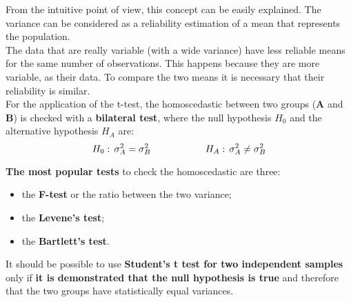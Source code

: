 \begin{frame}
  \vspace*{.25cm}
  From the intuitive point of view, this concept can be easily explained. The variance can be considered as a reliability estimation of a mean that represents the population.\\
  \vspace*{.25cm}
  The data that are really variable (with a wide variance) have less reliable means for the same number of observations. This happens because they are more variable, as their data. To compare the two means it is necessary that their reliability is similar.\\
  \vspace*{.25cm}
  For the application of the t-test, the homoscedastic between two groups (\textbf{A} and \textbf{B}) is checked with a \textbf{bilateral test}, where the null hypothesis $ H_0 $ and the alternative hypothesis $ H_A $ are:
  $$ H_0: \, \sigma^2_A = \sigma^2_B \mbox{\hspace*{2cm}} H_A: \, \sigma^2_A \neq \sigma^2_B $$
\end{frame}

\begin{frame}
  \vspace*{.25cm}
  \textbf{The most popular tests} to check the homoscedastic are three:
  \vspace{.25cm}
  \begin{itemize}
    \item the \textbf{F-test} or the ratio between the two variance;
    \vspace*{.25cm}
    \item the \textbf{Levene's test};
    \vspace*{.25cm}
    \item the \textbf{Bartlett's test}.
  \end{itemize}
  \vspace*{.5cm}
  It should be possible to use \textbf{Student's t test for two independent samples} only if \textbf{it is demonstrated that the null hypothesis is true} and therefore that the two groups have statistically equal variances.
\end{frame}


